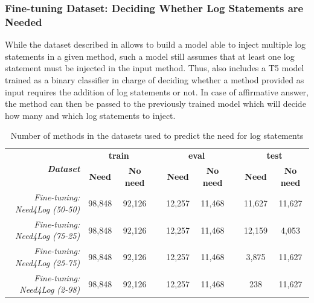 \subsubsection{Fine-tuning Dataset: Deciding Whether Log Statements are Needed} \label{sec:predicting-dataset}

While the dataset described in  allows to build a model able to inject multiple log statements in a given \java method, such a model still assumes that at least one log statement must be injected in the input method. Thus, \approach also includes a T5 model trained as a binary classifier in charge of deciding whether a method provided as input requires the addition of log statements or not. In case of affirmative answer, the method can then be passed to the previously trained model which will decide how many and which log statements to inject.

\begin{table}[h!]
	\centering
	\caption{Number of methods in the datasets used to predict the need for log statements}
	\begin{tabular}{rcccccccc}
		\toprule
		\multirow{2}{*}{\textit{\textbf{Dataset}}} & \multicolumn{2}{c}{\textbf{train}} & \textbf{} & \multicolumn{2}{c}{\textbf{eval}}  & \textbf{} & \multicolumn{2}{c}{\textbf{test}}  \\ \cline{2-3} \cline{5-6} \cline{8-9} 
		& \textbf{Need} & \textbf{No need}   & \textbf{} & \textbf{Need} & \textbf{No need}   & \textbf{} & \textbf{Need} & \textbf{No need}   \\ \midrule
		\textit{Fine-tuning: Need4Log (50-50)}         & 98,848        & 92,126             &           & 12,257        & 11,468             &           & 11,627        &  11,627            \\
		\textit{Fine-tuning: Need4Log (75-25)}         & 98,848        & 92,126             &           & 12,257        & 11,468             &           & 12,159        &  4,053             \\
		\textit{Fine-tuning: Need4Log (25-75)}         & 98,848        & 92,126             &           & 12,257        & 11,468             &           & 3,875         &  11,627            \\ 
		\textit{Fine-tuning: Need4Log (2-98)}         & 98,848        & 92,126             &           & 12,257        & 11,468             &           & 238         &  11,627            \\ 
		\bottomrule
	\end{tabular}
	\label{tab:ds-summary-2}
\end{table}

